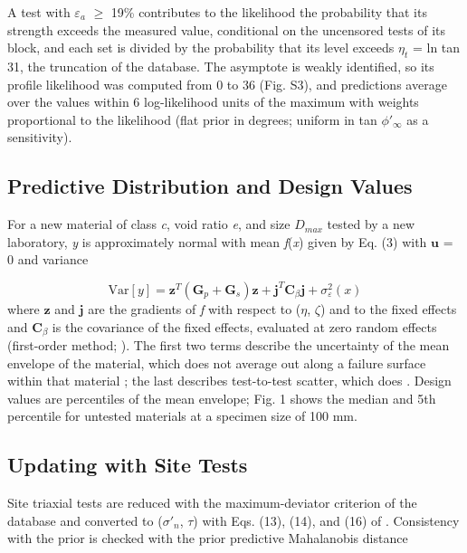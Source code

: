 \documentclass[Journal,letterpaper]{ascelike-new}
\begin{document}
A test with $\varepsilon_a$ $\ge$ 19\% contributes to the likelihood the probability that its strength exceeds the measured value, conditional on the uncensored tests of its block, and each set is divided by the probability that its level exceeds $\eta_t$ = ln tan 31\textdegree{}, the truncation of the database. The asymptote is weakly identified, so its profile likelihood was computed from 0\textdegree{} to 36\textdegree{} (Fig. S3), and predictions average over the values within 6 log-likelihood units of the maximum with weights proportional to the likelihood (flat prior in degrees; uniform in tan $\phi'_\infty$ as a sensitivity).

\subsection{Predictive Distribution and Design Values}
For a new material of class \textit{c}, void ratio \textit{e}, and size $D_{max}$ tested by a new laboratory, \textit{y} is approximately normal with mean \textit{f}(\textit{x}) given by Eq. (3) with $\mathbf{u}$ = 0 and variance

\begin{equation}
\mathrm{Var}[y]=\mathbf{z}^T(\mathbf{G}_p+\mathbf{G}_s)\mathbf{z}+\mathbf{j}^T\mathbf{C}_\beta\mathbf{j}+\sigma_\varepsilon^2(x)
\end{equation}
\noindent where $\mathbf{z}$ and $\mathbf{j}$ are the gradients of \textit{f} with respect to ($\eta$, $\zeta$) and to the fixed effects and $\mathbf{C}_\beta$ is the covariance of the fixed effects, evaluated at zero random effects (first-order method; ). The first two terms describe the uncertainty of the mean envelope of the material, which does not average out along a failure surface within that material \cite{christian1994}; the last describes test-to-test scatter, which does \cite{vanmarcke1977}. Design values are percentiles of the mean envelope; Fig. 1 shows the median and 5th percentile for untested materials at a specimen size of 100 mm.

\subsection{Updating with Site Tests}
Site triaxial tests are reduced with the maximum-deviator criterion of the database and converted to ($\sigma'_n$, $\tau$) with Eqs. (13), (14), and (16) of . Consistency with the prior is checked with the prior predictive Mahalanobis distance
\end{document}
